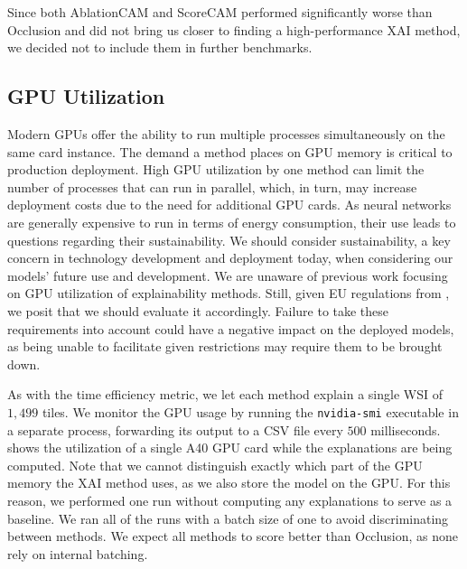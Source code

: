 Since both AblationCAM and ScoreCAM performed significantly worse than Occlusion and did not bring us closer to finding a high-performance XAI method, we decided not to include them in further benchmarks.

\subsection*{GPU Utilization}

Modern GPUs offer the ability to run multiple processes simultaneously on the same card instance.
The demand a method places on GPU memory is critical to production deployment.
High GPU utilization by one method can limit the number of processes that can run in parallel, which, in turn, may increase deployment costs due to the need for additional GPU cards.
As neural networks are generally expensive to run in terms of energy consumption, their use leads to questions regarding their sustainability.
We should consider sustainability, a key concern in technology development and deployment today, when considering our models' future use and development.
We are unaware of previous work focusing on GPU utilization of explainability methods.
Still, given EU regulations from , we posit that we should evaluate it accordingly.
Failure to take these requirements into account could have a negative impact on the deployed models, as being unable to facilitate given restrictions may require them to be brought down.

As with the time efficiency metric, we let each method explain a single WSI of $1,499$ tiles.
We monitor the GPU usage by running the \texttt{nvidia-smi} executable in a separate process, forwarding its output to a CSV file every $500$ milliseconds.
 shows the utilization of a single A40 GPU card while the explanations are being computed.
Note that we cannot distinguish exactly which part of the GPU memory the XAI method uses, as we also store the model on the GPU.
For this reason, we performed one run without computing any explanations to serve as a baseline.
We ran all of the runs with a batch size of one to avoid discriminating between methods.
We expect all methods to score better than Occlusion, as none rely on internal batching.

